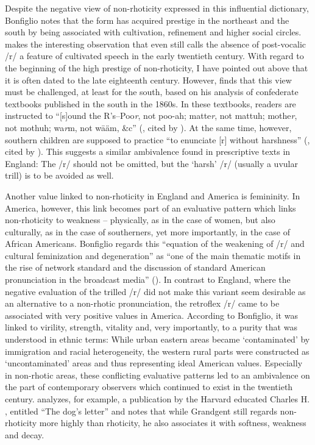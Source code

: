 Despite the negative view of non-rhoticity expressed in this influential dictionary, Bonfiglio notes that the form has acquired prestige in the northeast and the south by being associated with cultivation, refinement and higher social circles. \citet[41]{Bonfiglio2002} makes the interesting observation that even \citet[230--231]{Krapp19252} still calls the absence of post-vocalic /r/ a feature of cultivated speech in the early twentieth century. With regard to the beginning of the high prestige of non-rhoticity, I have pointed out above that it is often dated to the late eighteenth century. However, \citet{Montgomery2015} finds that this view must be challenged, at least for the south, based on his analysis of confederate textbooks published in the south in the 1860s. In these textbooks, readers are instructed to “[s]ound the R’s–Poo\emph{r}, not poo-ah; matte\emph{r}, not mattuh; mothe\emph{r}, not mothuh; wa\emph{r}m, not wāäm, \&c” (\citealt[13]{Chaudron1863}, cited by \citealt[108]{Montgomery2015}). At the same time, however, southern children are supposed to practice “to enunciate [r] without harshness” (\citealt[1]{Chaudron1863b}, cited by \citealt[108]{Montgomery2015}). This suggests a similar ambivalence found in prescriptive texts in England: The /r/ should not be omitted, but the ‘harsh’ /r/ (usually a uvular trill) is to be avoided as well.


Another value linked to non-rhoticity in England and America is femininity. In America, however, this link becomes part of an evaluative pattern which links non-rhoticity to weakness – physically, as in the case of women, but also culturally, as in the case of southerners, yet more importantly, in the case of African Americans. Bonfiglio regards this “equation of the weakening of /r/ and cultural feminization and degeneration” as “one of the main thematic motifs in the rise of network standard and the discussion of standard American pronunciation in the broadcast media” (\citeyear[46]{Bonfiglio2002}). In contrast to England, where the negative evaluation of the trilled /r/ did not make this variant seem desirable as an alternative to a non-rhotic pronunciation, the retroflex /r/ came to be associated with very positive values in America. According to Bonfiglio, it was linked to virility, strength, vitality and, very importantly, to a purity that was understood in ethnic terms: While urban eastern areas became ‘contaminated’ by immigration and racial heterogeneity, the western rural parts were constructed as ‘uncontaminated’ areas and thus representing ideal American values. Especially in non-rhotic areas, these conflicting evaluative patterns led to an ambivalence on the part of contemporary observers which continued to exist in the twentieth century. \citet[47--48]{Bonfiglio2002} analyzes, for example, a publication by the Harvard educated Charles H. \citet{Grandgent1920b}, entitled “The dog’s letter” and notes that while Grandgent still regards non-rhoticity more highly than rhoticity, he also associates it with softness, weakness and decay.

